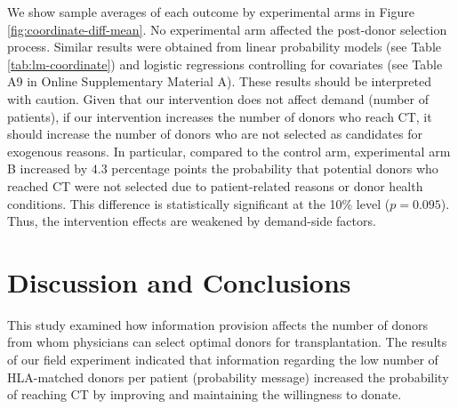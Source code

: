 \documentclass[12pt, a4paper]{article}
\begin{document}
We show sample averages of each outcome by experimental arms in Figure \ref{fig:coordinate-diff-mean}. No experimental arm affected the post-donor selection process. Similar results were obtained from linear probability models (see Table \ref{tab:lm-coordinate}) and logistic regressions controlling for covariates (see Table A9 in Online Supplementary Material A). These results should be interpreted with caution. Given that our intervention does not affect demand (number of patients), if our intervention increases the number of donors who reach CT, it should increase the number of donors who are not selected as candidates for exogenous reasons. In particular, compared to the control arm, experimental arm B increased by \(4.3\) percentage points the probability that potential donors who reached CT were not selected due to patient-related reasons or donor health conditions. This difference is statistically significant at the 10\% level (\(p = 0.095\)). Thus, the intervention effects are weakened by demand-side factors.

\hypertarget{conclusion}{%
\section{Discussion and Conclusions}\label{conclusion}}

This study examined how information provision affects the number of donors from whom physicians can select optimal donors for transplantation. The results of our field experiment indicated that information regarding the low number of HLA-matched donors per patient (probability message) increased the probability of reaching CT by improving and maintaining the willingness to donate.
\end{document}
